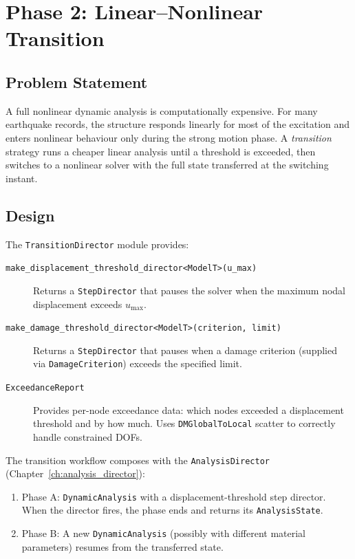 \section{Phase 2: Linear--Nonlinear Transition}
\label{sec:phase2_transition}

\subsection{Problem Statement}

A full nonlinear dynamic analysis is computationally expensive.  For
many earthquake records, the structure responds linearly for most of
the excitation and enters nonlinear behaviour only during the strong
motion phase.  A \emph{transition} strategy runs a cheaper linear
analysis until a threshold is exceeded, then switches to a nonlinear
solver with the full state transferred at the switching instant.

\subsection{Design}

The \texttt{TransitionDirector} module provides:

\begin{description}
  \item[\texttt{make\_displacement\_threshold\_director<ModelT>(u\_max)}]
    Returns a \texttt{StepDirector} that pauses the solver when the maximum
    nodal displacement exceeds $u_{\text{max}}$.

  \item[\texttt{make\_damage\_threshold\_director<ModelT>(criterion, limit)}]
    Returns a \texttt{StepDirector} that pauses when a damage criterion
    (supplied via \texttt{DamageCriterion}) exceeds the specified limit.

  \item[\texttt{ExceedanceReport}]
    Provides per-node exceedance data: which nodes exceeded a
    displacement threshold and by how much.  Uses \texttt{DMGlobalToLocal}
    scatter to correctly handle constrained DOFs.
\end{description}

\noindent
The transition workflow composes with the \texttt{AnalysisDirector}
(Chapter~\ref{ch:analysis_director}):
\begin{enumerate}
  \item Phase A: \texttt{DynamicAnalysis} with a displacement-threshold
        step director.  When the director fires, the phase ends and
        returns its \texttt{AnalysisState}.
  \item Phase B: A new \texttt{DynamicAnalysis} (possibly with different
        material parameters) resumes from the transferred state.
\end{enumerate}

